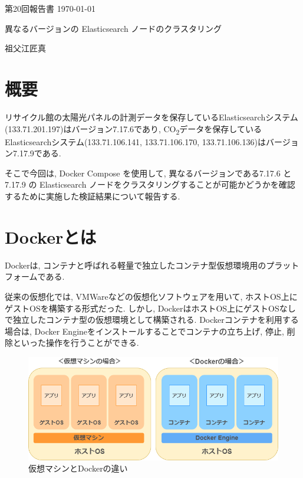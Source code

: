 \documentclass[a4j,12pt,]{jarticle}
\begin{document}
{\noindent\small 第20回報告書 \hfill\today}
\begin{center}
  {\Large 異なるバージョンの Elasticsearch ノードのクラスタリング}
\end{center}
\begin{flushright}
  祖父江匠真 \\
\end{flushright}

\section{概要}
リサイクル館の太陽光パネルの計測データを保存しているElasticsearchシステム(133.71.201.197)はバージョン7.17.6であり, CO\textsubscript{2}データを保存しているElasticsearchシステム(133.71.106.141, 133.71.106.170, 133.71.106.136)はバージョン7.17.9である.

そこで今回は, Docker Compose を使用して, 異なるバージョンである7.17.6 と 7.17.9 の Elasticsearch ノードをクラスタリングすることが可能かどうかを確認するために実施した検証結果について報告する.

\section{Dockerとは}
Dockerは, コンテナと呼ばれる軽量で独立したコンテナ型仮想環境用のプラットフォームである.

従来の仮想化では, VMWareなどの仮想化ソフトウェアを用いて, ホストOS上にゲストOSを構築する形式だった.
しかし, DockerはホストOS上にゲストOSなしで独立したコンテナ型の仮想環境として構築される.
Dockerコンテナを利用する場合は, Docker Engineをインストールすることでコンテナの立ち上げ, 停止, 削除といった操作を行うことができる.

\begin{figure}[H]
  \begin{center}
    \includegraphics[width=160mm]{docker-vmware.png}
    \caption{仮想マシンとDockerの違い \cite{2}}
    \label{p0}
  \end{center}
\end{figure}
\end{document}
